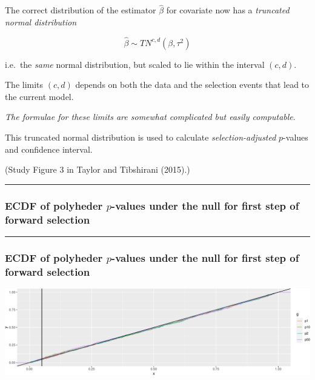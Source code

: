 \documentclass[
  letterpaper,
  DIV=11,
  numbers=noendperiod]{scrartcl}
\begin{document}
The correct distribution of the estimator \(\hat{\beta}\) for covariate
now has a \emph{truncated normal distribution}

\[ \hat{\beta} \sim TN^{c,d}(\beta,\tau^2)\]

i.e.~the \emph{same} normal distribution, but scaled to lie within the
interval \((c,d)\).

The limits \((c,d)\) depends on both the data and the selection events
that lead to the current model.

\emph{The formulae for these limits are somewhat complicated but easily
computable}.

This truncated normal distribution is used to calculate
\emph{selection-adjusted} \(p\)-values and confidence interval.

(Study Figure 3 in Taylor and Tibshirani (2015).)

\begin{center}\rule{0.5\linewidth}{0.5pt}\end{center}

\hypertarget{ecdf-of-polyheder-p-values-under-the-null-for-first-step-of-forward-selection}{%
\subsubsection{\texorpdfstring{ECDF of polyheder \(p\)-values under the
null for first step of forward
selection}{ECDF of polyheder p-values under the null for first step of forward selection}}\label{ecdf-of-polyheder-p-values-under-the-null-for-first-step-of-forward-selection}}

\begin{center}\rule{0.5\linewidth}{0.5pt}\end{center}

\hypertarget{ecdf-of-polyheder-p-values-under-the-null-for-first-step-of-forward-selection-1}{%
\subsubsection{\texorpdfstring{ECDF of polyheder \(p\)-values under the
null for first step of forward
selection}{ECDF of polyheder p-values under the null for first step of forward selection}}\label{ecdf-of-polyheder-p-values-under-the-null-for-first-step-of-forward-selection-1}}

\includegraphics{W6_files/figure-pdf/unnamed-chunk-41-1.pdf}
\end{document}
